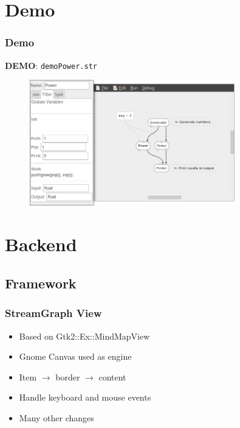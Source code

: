 \documentclass{beamer}
\begin{document}
\section{Demo}
\begin{frame}
\frametitle{Demo}
	\textbf{DEMO}: \texttt{demoPower.str}
	\begin{figure}[h]
		\centering
		\includegraphics[width=0.8\textwidth]{demoPower}
		\label{fig_demoPower}
	\end{figure}
\end{frame}


\section{Backend}

\subsection{Framework}
\begin{frame}
\frametitle{StreamGraph View}
 \begin{itemize}
 	\item Based on Gtk2::Ex::MindMapView \cite{GTK2EXMindMapView}
	\item Gnome Canvas used as engine
	\item Item $\rightarrow$ border $\rightarrow$ content
	\item Handle keyboard and mouse events
	\item Many other changes
 \end{itemize}
\end{frame}


\end{document}
